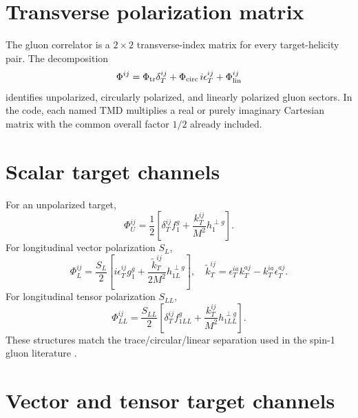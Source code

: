 \documentclass[11pt,oneside]{book}
\begin{document}
\section{Transverse polarization matrix}

The gluon correlator is a $2\times2$ transverse-index matrix for every target-helicity pair.  The decomposition
\begin{equation}
 \Phi^{ij}=\Phi_{\rm tr}\delta_T^{ij}
 +\Phi_{\rm circ}\,i\epsilon_T^{ij}
 +\Phi_{\rm lin}^{ij}
 \label{eq:gluon-decomp-repeat}
\end{equation}
identifies unpolarized, circularly polarized, and linearly polarized gluon sectors.  In the code, each named TMD multiplies a real or purely imaginary Cartesian matrix with the common overall factor $1/2$ already included.

\section{Scalar target channels}

For an unpolarized target,
\begin{equation}
 \Phi_U^{ij}
 =\frac12\left[
 \delta_T^{ij}f_1^g
 +\frac{k_T^{ij}}{M^2}h_1^{\perp g}
 \right].
 \label{eq:gluon-U}
\end{equation}
For longitudinal vector polarization $S_L$,
\begin{equation}
 \Phi_L^{ij}
 =\frac{S_L}{2}\left[
 i\epsilon_T^{ij}g_1^g
 +\frac{\widetilde k_T^{ij}}{2M^2}h_{1L}^{\perp g}
 \right],
 \quad
 \widetilde k_T^{ij}=\epsilon_T^{ia}k_T^{aj}-k_T^{ia}\epsilon_T^{aj}.
 \label{eq:gluon-L}
\end{equation}
For longitudinal tensor polarization $S_{LL}$,
\begin{equation}
 \Phi_{LL}^{ij}
 =\frac{S_{LL}}{2}\left[
 \delta_T^{ij}f_{1LL}^g
 +\frac{k_T^{ij}}{M^2}h_{1LL}^{\perp g}
 \right].
 \label{eq:gluon-LL}
\end{equation}
These structures match the trace/circular/linear separation used in the spin-1 gluon literature \cite{BoerEtAl2016,CotognoVanDaalMulders2017,XieChenLu2026}.

\section{Vector and tensor target channels}
\end{document}
